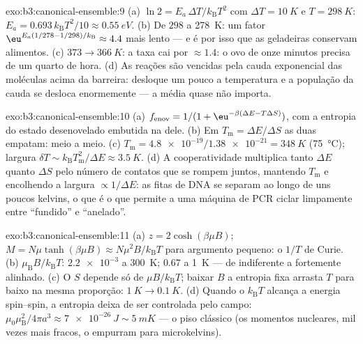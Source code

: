 \begin{solution}{exo:b3:canonical-ensemble:9}
(a) $\ln2 = E_a\,\Delta T/k_{\text{B}}T^2$ com $\Delta T =
\qty{10}{K}$ e $T = \qty{298}{K}$: $E_a =
0.693\,k_{\text{B}}T^2/10 \approx \qty{0.55}{eV}$. (b) De
$298$ a \qty{278}{K}: um fator $\eu^{E_a(1/278 - 1/298)/k_{\text{B}}}
\approx 4.4$ mais lento --- e é por isso que as geladeiras conservam
alimentos. (c) $373 \to \qty{366}{K}$: a taxa cai por $\approx1.4$: o ovo
de onze minutos precisa de um quarto de hora. (d) As reações são
vencidas pela cauda exponencial das moléculas acima da barreira:
desloque um pouco a temperatura e a população da cauda se desloca
enormemente --- a média quase não importa.
\end{solution}

\begin{solution}{exo:b3:canonical-ensemble:10}
(a) $f_{\text{enov}} = 1/(1 + \eu^{-\beta(\Delta E -
T\Delta S)})$, com a entropia do estado desenovelado embutida na
 dele. (b) Em $T_{\text{m}} = \Delta E/\Delta S$ as duas
 empatam: meio a meio. (c) $T_{\text{m}} =
\num{4.8e-19}/\num{1.38e-21} = \qty{348}{K}$ (\qty{75}{\celsius});
largura $\delta T \sim k_{\text{B}}T_{\text{m}}^2/\Delta E \approx
\qty{3.5}{K}$. (d) A cooperatividade multiplica tanto $\Delta E$ quanto
$\Delta S$ pelo número de contatos que se rompem juntos, mantendo
$T_{\text{m}}$ e encolhendo a largura $\propto 1/\Delta E$: as fitas de
DNA se separam ao longo de uns poucos kelvins, o que é o que permite a
uma máquina de PCR ciclar limpamente entre ``fundido'' e ``anelado''.
\end{solution}

\begin{solution}{exo:b3:canonical-ensemble:11}
(a) $z = 2\cosh(\beta\mu B)$; $M = N\mu\tanh(\beta\mu B) \approx
N\mu^2B/k_{\text{B}}T$ para argumento pequeno: o $1/T$ de Curie. (b)
$\mu_{\text{B}}B/k_{\text{B}}T$: $\num{2.2e-3}$ a \qty{300}{K};
$0.67$ a \qty{1}{K} --- de indiferente a fortemente alinhado. (c)
O $S$ depende só de $\mu B/k_{\text{B}}T$; baixar $B$ a entropia fixa
arrasta $T$ para baixo na mesma proporção: $\qty{1}{K} \to
\qty{0.1}{K}$. (d) Quando o $k_{\text{B}}T$ alcança a energia
spin--spin, a entropia deixa de ser controlada pelo campo:
$\mu_0\mu_{\text{B}}^2/4\pi a^3 \approx \qty{7e-26}{J} \sim
\qty{5}{mK}$ --- o piso clássico (os momentos nucleares, mil vezes mais
fracos, o empurram para microkelvins).
\end{solution}

